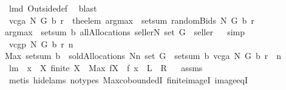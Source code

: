 \begin{isabellebody}
\ lm{}{}d\ Outside{\isacharunderscore}def\ \isamarkupfalse%
\ blast\isanewline
{}\isamarkupfalse%
%
\endisatagproof
{\isafoldproof}%
%
\isadelimproof
%
\endisadelimproof
\isanewline
\isanewline
{}\isamarkupfalse%
\ {\isachardoublequoteopen}vcga{\isacharprime}\ N\ G\ b\ r\ {\isacharequal}\ the{\isacharunderscore}elem\ {\isacharparenleft}{\isacharparenleft}argmax\ {\isasymcirc}\ setsum{\isacharparenright}\ {\isacharparenleft}randomBids{\isacharprime}\ N\ G\ b\ r{\isacharparenright}\ \isanewline
{\isacharparenleft}{\isacharparenleft}argmax\ {\isasymcirc}\ setsum{\isacharparenright}\ b\ {\isacharparenleft}allAllocations\ {\isacharparenleft}{\isacharbraceleft}seller{\isacharbraceright}{\isasymunion}N{\isacharparenright}\ {\isacharparenleft}set\ G{\isacharparenright}{\isacharparenright}{\isacharparenright}{\isacharparenright}\ {\isacharminus}{\isacharminus}\ seller{\isachardoublequoteclose}%
\isadelimproof
\ %
\endisadelimproof
%
\isatagproof
{}\isamarkupfalse%
\ simp%
\endisatagproof
{\isafoldproof}%
%
\isadelimproof
%
\endisadelimproof
\isanewline
\isanewline
{}\isamarkupfalse%
\ {\isachardoublequoteopen}vcgp\ N\ G\ b\ r\ n\ {\isacharequal}{\isacharequal}\isanewline
Max\ {\isacharparenleft}setsum\ b\ {\isacharbackquote}\ {\isacharparenleft}soldAllocations\ {\isacharparenleft}N{\isacharminus}{\isacharbraceleft}n{\isacharbraceright}{\isacharparenright}\ {\isacharparenleft}set\ G{\isacharparenright}{\isacharparenright}{\isacharparenright}\ {\isacharminus}\ {\isacharparenleft}setsum\ b\ {\isacharparenleft}vcga\ N\ G\ b\ r\ {\isacharminus}{\isacharminus}\ n{\isacharparenright}{\isacharparenright}{\isachardoublequoteclose}\isanewline
\isanewline
{}\isamarkupfalse%
\ lm{}{}{\isacharcolon}\ \ {\isachardoublequoteopen}x\ {\isasymin}\ X{\isachardoublequoteclose}\ {\isachardoublequoteopen}finite\ X{\isachardoublequoteclose}\ \ {\isachardoublequoteopen}Max\ {\isacharparenleft}f{\isacharbackquote}X{\isacharparenright}\ {\isachargreater}{\isacharequal}\ f\ x{\isachardoublequoteclose}\ {\isacharparenleft}\ {\isachardoublequoteopen}{\isacharquery}L\ {\isachargreater}{\isacharequal}\ {\isacharquery}R{\isachardoublequoteclose}{\isacharparenright}%
\isadelimproof
\ %
\endisadelimproof
%
\isatagproof
{}\isamarkupfalse%
\ assms\ \isanewline
{}\isamarkupfalse%
\ {\isacharparenleft}metis\ {\isacharparenleft}hide{\isacharunderscore}lams{\isacharcomma}\ no{\isacharunderscore}types{\isacharparenright}\ Max{\isachardot}coboundedI\ finite{\isacharunderscore}imageI\ image{\isacharunderscore}eqI{\isacharparenright}%

\end{isabellebody}
